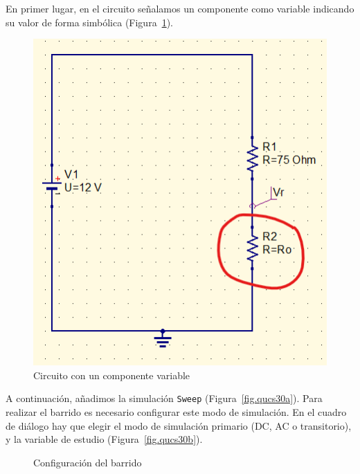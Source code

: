 \documentclass[a4paper,10pt]{article} %
\begin{document}
En primer lugar, en el circuito señalamos un componente como variable indicando su valor de forma simbólica (Figura~\ref{fig.qucs29}).
\begin{figure}[h!]
    \centering
    \includegraphics[width=0.25\linewidth]{../figs/qucs_CircuitoSweep.png}
    \caption{Circuito con un componente variable}
    \label{fig.qucs29}
\end{figure}

A continuación, añadimos la simulación \texttt{Sweep} (Figura~\ref{fig.qucs30a}). Para realizar el barrido es necesario configurar este modo de simulación. En el cuadro de diálogo hay que elegir el modo de simulación primario (DC, AC o transitorio), y la variable de estudio  (Figura~\ref{fig.qucs30b}).

\begin{figure}[htbp]
    \centering
    \hfill
    \caption{Configuración del barrido}
    \label{fig.qucs30}
\end{figure}
\end{document}
